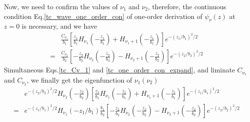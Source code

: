   Now, we need to confirm the values of $\nu_1$ and $\nu_2$, therefore, the continuous condition Eq.\eqref{tc_wave_one_order_con} of one-order derivation of $\psi_\nu(z)$ at $z = 0$ is necessary, and we have
  \begin{equation}
    \begin{aligned}
      & \frac{C_{\nu_{1}}}{b_{1}}\left[\frac{z_{1}}{b_{1}} H_{\nu_{1}}\left(-\frac{z_{1}}{b_{1}}\right)+H_{\nu_{1}+1}\left(-\frac{z_{1}}{b_{1}}\right)\right] e^{-\left(z_{1} / b_{1}\right)^{2} / 2} \\
      =& \frac{C_{\nu_{2}}}{b_{2}}\left[-\frac{z_{2}}{b_{2}} H_{\nu_{2}}\left(-\frac{z_{2}}{b_{2}}\right)-H_{\nu_{2}+1}\left(-\frac{z_{2}}{b_{2}}\right)\right] e^{-\left(z_{2} / b_{2}\right)^{2} / 2}   \label{tc_one_order_con_expand}
    \end{aligned}
  \end{equation}
  Simultaneous Eqs.\eqref{tc_Cv_1} and \eqref{tc_one_order_con_expand}, and liminate $C_{\nu_1}$ and $C_{\nu_2}$, we finally get the eigenfunction of $\nu_1(\nu_2)$
  \begin{equation}
    \begin{aligned}
      & e^{-\left(z_{2} / b_{2}\right)^{2} / 2} H_{\nu_{2}}\left(-\frac{z_{2}}{b_{2}}\right)\left[\frac{z_{1}}{b_{1}} H_{\nu_{1}}\left(-\frac{z_{1}}{b_{1}}\right)+H_{\nu_{1}+1}\left(-\frac{z_{1}}{b_{1}}\right)\right] e^{-\left(z_{1} / b_{1}\right)^{2} / 2} \\
      =& e^{-\left(z_{1} / b_{1}\right)^{2} / 2} H_{\nu_{1}}\left(-z_{1} / b_{1}\right) \frac{b_{1}}{b_{2}}\left[-\frac{z_{2}}{b_{2}} H_{\nu_{2}}\left(-\frac{z_{2}}{b_{2}}\right)-H_{\nu_{2}+1}\left(-\frac{z_{2}}{b_{2}}\right)\right] e^{-\left(z_{2} / b_{2}\right)^{2} / 2}  \label{tc_eigen_func_Cv}
    \end{aligned}
  \end{equation}
